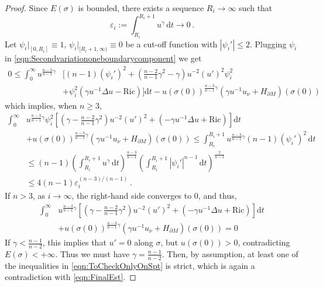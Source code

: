 \documentclass[12pt,a4paper,reqno]{amsart}
\theoremstyle{definition}
\renewcommand{\leq}{\leqslant}
\renewcommand{\geq}{\geqslant}
\begin{document}
{\begin{proof}
    Since $E(\sigma)$ is bounded, there exists a sequence $R_i \to \infty$ such that
    \[
        \varepsilon_i := \int^{R_i + 1}_{R_i} u^\gamma\,\mathrm{d}t \to 0\,.
    \]
    Let $\psi_i|_{[0,R_i]} \equiv 1$, $\psi_i|_{[R_i + 1, \infty)} \equiv 0$ be a cut-off function with $|\psi_i'| \leq 2$. Plugging $\psi_i$ in \eqref{eqn:Secondvariationoneboundarycomponent} we get
    \[
    \begin{aligned}
        0 \leq \int^\infty_0 u^{\frac{n -3}{n-1}\gamma}&[(n - 1)(\psi_i')^2 + \left(\frac{n - 2}{n - 1}\gamma^2 - \gamma\right) u^{-2}(u')^2 \psi_i^2\,  \\
        &+\psi_i^2(\gamma u^{-1}\Delta u - \mathrm{Ric})]\mathrm{d}t - u(\sigma(0))^{\frac{n-3}{n-1}\gamma}(\gamma u ^{-1}u_\nu + H_{\partial M})(\sigma(0))
    \end{aligned}
    \]
    which implies, when $n\geq 3$,
    \begin{align*}
        \int^\infty_0 &u^{\frac{n -3}{n-1}\gamma}\psi_i^2\left[\left(\gamma - \frac{n - 2}{n - 1}\gamma^2\right) u^{-2}(u')^2 + (-\gamma u^{-1}\Delta u + \mathrm{Ric})\right]\mathrm{d}t \\ 
        &+ u(\sigma(0))^{\frac{n-3}{n-1}\gamma}(\gamma u ^{-1}u_\nu + H_{\partial M})(\sigma(0))
        \leq \int^{R_i + 1}_{R_i} u^{\frac{n -3}{n-1}\gamma}(n - 1)(\psi_i')^2 \, \mathrm{d}t\\
        &\leq (n-1)\left(\int^{R_i + 1}_{R_i} u^{\gamma} \, \mathrm{d}t \right) ^{\frac{n-3}{n-1}}\left(\int^{R_i + 1}_{R_i}|\psi_i'|^{n-1} \, \mathrm{d}t \right)^{\frac{2}{n-1}}\\
        &\leq 4(n-1)\varepsilon_i^{(n-3)/(n-1)}\,.
    \end{align*}
    If $n>3$, as $i \to \infty$, the right-hand side converges to $0$, and thus, 
    \begin{equation}\label{eqn:FinalEst}
    \begin{aligned}
        \int^\infty_0 &u^{\frac{n -3}{n-1}\gamma}\left[\left(\gamma - \frac{n - 2}{n - 1}\gamma^2\right) u^{-2}(u')^2 + (-\gamma u^{-1}\Delta u + \mathrm{Ric})\right]\mathrm{d}t  \\
        &+ u(\sigma(0))^{\frac{n-3}{n-1}\gamma}(\gamma u ^{-1}u_\nu + H_{\partial M})(\sigma(0)) = 0
        \end{aligned}
    \end{equation}
    If $\gamma<\frac{n-1}{n-2}$, this implies that $u' = 0$ along $\sigma$, but $u(\sigma(0)) > 0$, contradicting $E(\sigma) < +\infty$. Thus we must have $\gamma=\frac{n-1}{n-2}$. Then, by assumption, at least one of the inequalities in \eqref{eqn:ToCheckOnlyOnSpt} is strict, which is again a contradiction with \eqref{eqn:FinalEst}. 
    

\end{proof}}
\end{document}
